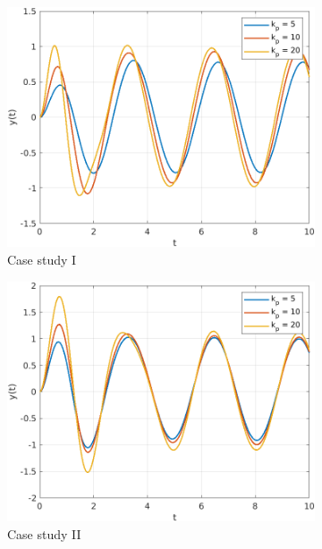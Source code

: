 \documentclass{article}
\begin{document}
\begin{figure}[H]
    \centering
    \begin{subfigure}{0.325\textwidth}
        \centering
        \includegraphics[width = \textwidth]{figures/part_3_kp.png}
        \caption{Case study I}
    \end{subfigure}
    \begin{subfigure}{0.325\textwidth}
        \centering
        \includegraphics[width = \textwidth]{figures/part_3_ki.png}
        \caption{Case study II}
    \end{subfigure}
    \begin{subfigure}{0.325\textwidth}
        \centering

\end{subfigure}
\end{figure}
\end{document}
